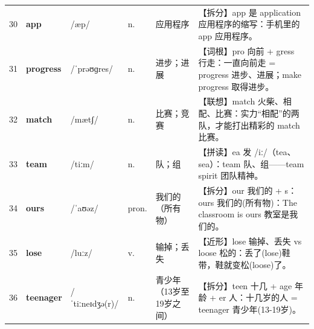 \documentclass[UTF8,a4paper,11pt,oneside]{ctexbook}
\newcommand{\cellword}[1]{{\bfseries\textcolor{wordcol}{#1}}}
\newcommand{\cellipa}[1]{{\footnotesize\textcolor{ipacol}{#1}}}
\newcommand{\cellpos}[1]{\textcolor{poscol}{#1}}
\newcommand{\cellno}[1]{\textcolor{volcolor!75!black}{#1}}
\begin{document}
{\begin{longtable}{@{}C{0.045\textwidth}L{0.155\textwidth}L{0.175\textwidth}C{0.070\textwidth}L{0.180\textwidth}L{0.282\textwidth}@{}}
\cellno{30} & \cellword{app} & \cellipa{/æp/} & \cellpos{n.} & 应用程序 & \textcolor{tagSplit}{【拆分】}app 是 application 应用程序的缩写：手机里的 app 应用程序。 \\
 \cellno{31} & \cellword{progress} & \cellipa{/ˈprəʊɡres/} & \cellpos{n.} & 进步；进展 & \textcolor{tagRoot}{【词根】}pro 向前 + gress 行走：一直向前走 = progress 进步、进展；make progress 取得进步。 \\
\cellno{32} & \cellword{match} & \cellipa{/mætʃ/} & \cellpos{n.} & 比赛；竞赛 & \textcolor{tagAssoc}{【联想】}match 火柴、相配、比赛：实力“相配”的两队，才能打出精彩的 match 比赛。 \\
 \cellno{33} & \cellword{team} & \cellipa{/tiːm/} & \cellpos{n.} & 队；组 & \textcolor{tagSpell}{【拼读】}ea 发 /iː/（tea、sea）：team 队、组——team spirit 团队精神。 \\
\cellno{34} & \cellword{ours} & \cellipa{/ˈaʊəz/} & \cellpos{pron.} & 我们的（所有物） & \textcolor{tagSplit}{【拆分】}our 我们的 + s：ours 我们的(所有物)：The classroom is ours 教室是我们的。 \\
 \cellno{35} & \cellword{lose} & \cellipa{/luːz/} & \cellpos{v.} & 输掉；丢失 & \textcolor{tagNear}{【近形】}lose 输掉、丢失 vs loose 松的：丢了(lose)鞋带，鞋就变松(loose)了。 \\
\cellno{36} & \cellword{teenager} & \cellipa{/ˈtiːneɪdʒə(r)/} & \cellpos{n.} & 青少年（13岁至19岁之间） & \textcolor{tagSplit}{【拆分】}teen 十几 + age 年龄 + er 人：十几岁的人 = teenager 青少年(13-19岁)。 \\
\end{longtable}
}

\end{document}
